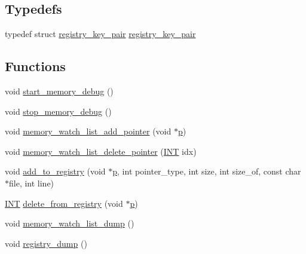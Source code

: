 \subsection*{Typedefs}
\begin{DoxyCompactItemize}
\item 
typedef struct \mbox{\hyperlink{structregistry__key__pair}{registry\+\_\+key\+\_\+pair}} \mbox{\hyperlink{_g_a_l_o_i_s_2memory_8_c_ab15b8149755765b4462716a73cb1a554}{registry\+\_\+key\+\_\+pair}}
\end{DoxyCompactItemize}
\subsection*{Functions}
\begin{DoxyCompactItemize}
\item 
void \mbox{\hyperlink{_g_a_l_o_i_s_2memory_8_c_afda2bf7e5a86ca15c831d40d453dd697}{start\+\_\+memory\+\_\+debug}} ()
\item 
void \mbox{\hyperlink{_g_a_l_o_i_s_2memory_8_c_ab61b81cda14309e9a7bd2bbb8c76f085}{stop\+\_\+memory\+\_\+debug}} ()
\item 
void \mbox{\hyperlink{_g_a_l_o_i_s_2memory_8_c_a9823edc9b5efce56dc5fbb3197883124}{memory\+\_\+watch\+\_\+list\+\_\+add\+\_\+pointer}} (void $\ast$\mbox{\hyperlink{alphabet2_8_c_a533391314665d6bf1b5575e9a9cd8552}{p}})
\item 
void \mbox{\hyperlink{_g_a_l_o_i_s_2memory_8_c_a2c4826924dfa6adbdb27df2e468a75f3}{memory\+\_\+watch\+\_\+list\+\_\+delete\+\_\+pointer}} (\mbox{\hyperlink{galois_8h_a09fddde158a3a20bd2dcadb609de11dc}{I\+NT}} idx)
\item 
void \mbox{\hyperlink{_g_a_l_o_i_s_2memory_8_c_a6920a250c4e7a0770cdef39eb9bf20ad}{add\+\_\+to\+\_\+registry}} (void $\ast$\mbox{\hyperlink{alphabet2_8_c_a533391314665d6bf1b5575e9a9cd8552}{p}}, int pointer\+\_\+type, int size, int size\+\_\+of, const char $\ast$file, int line)
\item 
\mbox{\hyperlink{galois_8h_a09fddde158a3a20bd2dcadb609de11dc}{I\+NT}} \mbox{\hyperlink{_g_a_l_o_i_s_2memory_8_c_ad4070b75aa389dce4dea489e498d03c5}{delete\+\_\+from\+\_\+registry}} (void $\ast$\mbox{\hyperlink{alphabet2_8_c_a533391314665d6bf1b5575e9a9cd8552}{p}})
\item 
void \mbox{\hyperlink{_g_a_l_o_i_s_2memory_8_c_ad0967d55a42071e28f50be4fbe7893bd}{memory\+\_\+watch\+\_\+list\+\_\+dump}} ()
\item 
void \mbox{\hyperlink{_g_a_l_o_i_s_2memory_8_c_a8ad65cbe10865661e8bafd6be2164955}{registry\+\_\+dump}} ()

\end{DoxyCompactItemize}
